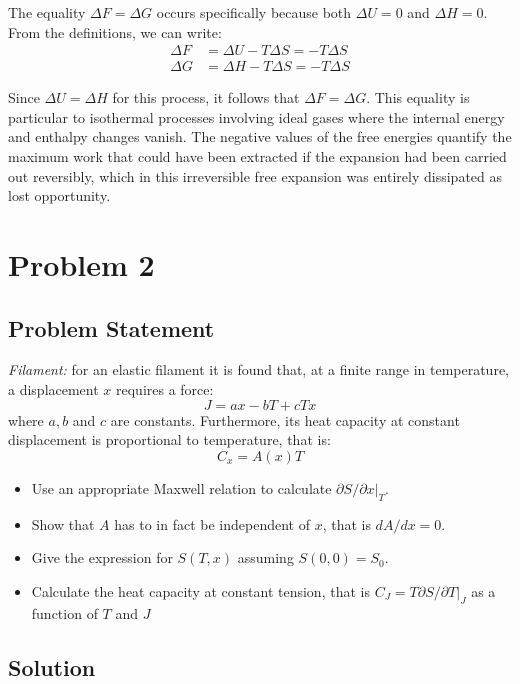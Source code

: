 \documentclass[10pt,twocoloumn]{article}
\begin{document}
The equality $\Delta F = \Delta G$ occurs specifically because both $\Delta U = 0$ and $\Delta H = 0$. From the definitions, we can write:
\begin{align}
    \Delta F &= \Delta U - T\Delta S = -T\Delta S \\
    \Delta G &= \Delta H - T\Delta S = -T\Delta S
\end{align}

Since $\Delta U = \Delta H$ for this process, it follows that $\Delta F = \Delta G$. This equality is particular to isothermal processes involving ideal gases where the internal energy and enthalpy changes vanish. The negative values of the free energies quantify the maximum work that could have been extracted if the expansion had been carried out reversibly, which in this irreversible free expansion was entirely dissipated as lost opportunity.
\section*{Problem 2}
\subsection*{Problem Statement}
\textit{Filament:} for an elastic filament it is found that, at a finite range in temperature, a displacement $x$ requires a force:
\begin{equation}
    J = ax - bT + cT x
\end{equation}
where $a,b$ and $c$ are constants. Furthermore, its heat capacity at constant displacement is proportional to temperature, that is:
\begin{equation}
    C_x = A(x)T
\end{equation}
\begin{itemize}
    \item Use an appropriate Maxwell relation to calculate $\partial S / \partial x |_T$.
    \item Show that $A$ has to in fact be independent of $x$, that is $dA/dx = 0$.
    \item Give the expression for $S(T,x)$ assuming $S(0,0)=S_0$.
    \item Calculate the heat capacity at constant tension, that is $C_J = T\partial S / \partial T|_J$ as a function of $T$ and $J$
\end{itemize}

\subsection*{Solution}
\end{document}
